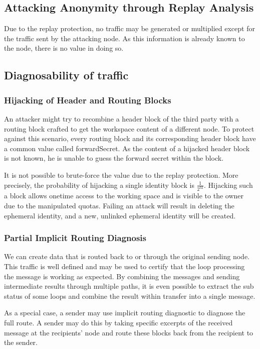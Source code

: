 \subsection{Attacking Anonymity through Replay Analysis}
Due to the replay protection, no traffic may be generated or multiplied except for the traffic sent by the attacking node. As this information is already known to the node, there is no value in doing so. 

\subsection{Diagnosability of traffic}

\subsubsection{Hijacking of Header and Routing Blocks}
An attacker might try to recombine a header block of the third party with a routing block crafted to get the workspace content of a different node. To protect against this scenario, every routing block and its corresponding header block have a common value called forwardSecret. As the content of a hijacked header block is not known, he is unable to guess the forward secret within the block.

It is not possible to brute-force the value due to the replay protection. More precisely, the probability of hijacking a single identity block is $\frac{1}{2^{32}}$. Hijacking such a block allows onetime access to the working space and is visible to the owner due to the manipulated quotas. Failing an attack will result in deleting the ephemeral identity, and a new, unlinked ephemeral identity will be created. 

\subsubsection{Partial Implicit Routing Diagnosis}
We can create data that is routed back to or through the original sending node. This traffic is well defined and may be used to certify that the loop processing the message is working as expected. By combining the messages and sending intermediate results through multiple paths, it is even possible to extract the sub status of some loops and combine the result within transfer into a single message.

As a special case, a sender may use implicit routing diagnostic to diagnose the full route. A sender may do this by taking specific excerpts of the received message at the recipients' node and route these blocks back from the recipient to the sender. 

